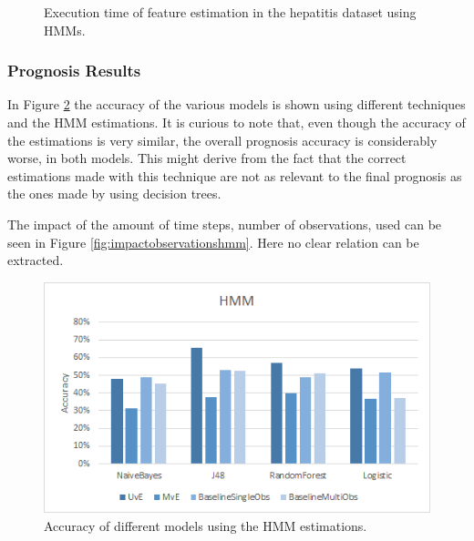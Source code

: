 
\begin{figure}[h]
  \begin{subfigmatrix}{2}
  \end{subfigmatrix}
  \caption{Execution time of feature estimation in the hepatitis dataset using HMMs.}
  \label{fig:estimationtimehmm}
\end{figure}

\subsubsection{Prognosis Results}
\label{subsubsection:prognosis_hmm}

In Figure \ref{fig:accuracyhmm} the accuracy of the various models is shown using different techniques and the HMM estimations. It is curious to note
that, even though the accuracy of the estimations is very similar, the overall prognosis accuracy is considerably worse, in both models. This might derive from the fact that the correct estimations made with this technique are not as relevant to the final prognosis as the ones made by using decision trees. 

The impact of the amount of time steps, number of observations, used can be seen in Figure \ref{fig:impactobservationshmm}. Here no clear relation can be extracted.

\begin{figure}[h]
	\centering
	\includegraphics[width=0.49\linewidth]{Figures/accuracy_h_hmm.png}
	\caption{Accuracy of different models using the HMM estimations.}
	\label{fig:accuracyhmm}
\end{figure}

